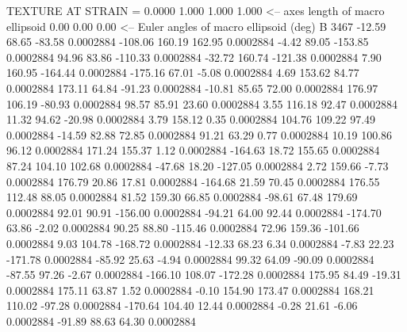 TEXTURE AT STRAIN =    0.0000
   1.000   1.000   1.000  <-- axes length of macro ellipsoid
    0.00    0.00    0.00  <-- Euler angles of macro ellipsoid (deg)
B      3467
      -12.59       68.65      -83.58     0.0002884
     -108.06      160.19      162.95     0.0002884
       -4.42       89.05     -153.85     0.0002884
       94.96       83.86     -110.33     0.0002884
      -32.72      160.74     -121.38     0.0002884
        7.90      160.95     -164.44     0.0002884
     -175.16       67.01       -5.08     0.0002884
        4.69      153.62       84.77     0.0002884
      173.11       64.84      -91.23     0.0002884
      -10.81       85.65       72.00     0.0002884
      176.97      106.19      -80.93     0.0002884
       98.57       85.91       23.60     0.0002884
        3.55      116.18       92.47     0.0002884
       11.32       94.62      -20.98     0.0002884
        3.79      158.12        0.35     0.0002884
      104.76      109.22       97.49     0.0002884
      -14.59       82.88       72.85     0.0002884
       91.21       63.29        0.77     0.0002884
       10.19      100.86       96.12     0.0002884
      171.24      155.37        1.12     0.0002884
     -164.63       18.72      155.65     0.0002884
       87.24      104.10      102.68     0.0002884
      -47.68       18.20     -127.05     0.0002884
        2.72      159.66       -7.73     0.0002884
      176.79       20.86       17.81     0.0002884
     -164.68       21.59       70.45     0.0002884
      176.55      112.48       88.05     0.0002884
       81.52      159.30       66.85     0.0002884
      -98.61       67.48      179.69     0.0002884
       92.01       90.91     -156.00     0.0002884
      -94.21       64.00       92.44     0.0002884
     -174.70       63.86       -2.02     0.0002884
       90.25       88.80     -115.46     0.0002884
       72.96      159.36     -101.66     0.0002884
        9.03      104.78     -168.72     0.0002884
      -12.33       68.23        6.34     0.0002884
       -7.83       22.23     -171.78     0.0002884
      -85.92       25.63       -4.94     0.0002884
       99.32       64.09      -90.09     0.0002884
      -87.55       97.26       -2.67     0.0002884
     -166.10      108.07     -172.28     0.0002884
      175.95       84.49      -19.31     0.0002884
      175.11       63.87        1.52     0.0002884
       -0.10      154.90      173.47     0.0002884
      168.21      110.02      -97.28     0.0002884
     -170.64      104.40       12.44     0.0002884
       -0.28       21.61       -6.06     0.0002884
      -91.89       88.63       64.30     0.0002884
